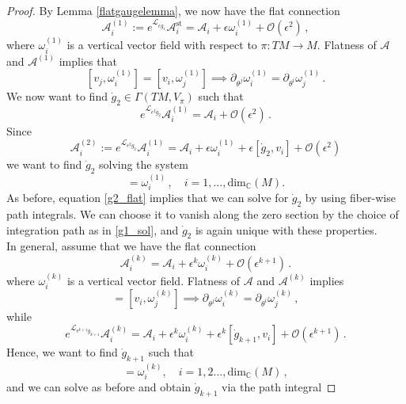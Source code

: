 \documentclass{article}
\theoremstyle{definition}
\numberwithin{equation}{section}
\begin{document}
\begin{proof}
By Lemma \ref{flatgaugelemma}, we now have the flat connection
\begin{equation*}
    \mathcal{A}_i^{(1)}:=e^{\mathcal{L}_{\epsilon\dot{g}_1}}\mathcal{A}^{\text{st}}_i=\mathcal{A}_i+\epsilon\omega_i^{(1)}+\mathcal{O}(\epsilon^2)\,,
\end{equation*}
where $\omega_i^{(1)}$ is a vertical vector field with respect to $\pi:TM \to M$. 
Flatness of $\mathcal{A}$ and $\mathcal{A}^{(1)}$ implies that
\begin{equation}\label{g2_flat}
    [v_j,\omega_i^{(1)}]=[v_i,\omega_j^{(1)}] \implies\partial_{\theta^j}\omega_i^{(1)}=\partial_{\theta^i}\omega_j^{(1)}\,.
\end{equation}
We now want to find $\dot{g}_2\in \Gamma(TM,V_{\pi})$ such that
\begin{equation*}
    e^{\mathcal{L}_{\epsilon^2\dot{g}_2}}\mathcal{A}_i^{(1)}=\mathcal{A}_i+\mathcal{O}(\epsilon^2)\,.
\end{equation*}
Since
\begin{equation*}
    \mathcal{A}_i^{(2)}:=e^{\mathcal{L}_{\epsilon^2\dot{g}_2}}\mathcal{A}_i^{(1)}=\mathcal{A}_i+\epsilon\omega_i^{(1)}+\epsilon[\dot{g}_2,v_i]+\mathcal{O}(\epsilon^2)
\end{equation*}
we want to find $\dot{g}_2$ solving the system 
\begin{equation*}
    [v_i,\dot{g}_2]=\omega_i^{(1)}\,, \quad i=1,...,\text{dim}_{\mathbb{C}}(M). 
\end{equation*}
As before, equation \eqref{g2_flat} implies that we can solve for $\dot{g}_2$ by using fiber-wise path integrals. We can choose it to vanish along the zero section by the choice of integration path as in \eqref{g1_sol}, and $\dot{g}_2$ is again unique with these properties. \\

In general, assume that we have the flat connection 
\begin{equation*}
    \mathcal{A}_i^{(k)}=\mathcal{A}_i+\epsilon^k\omega_i^{(k)}+\mathcal{O}(\epsilon^{k+1})\,.
\end{equation*}
where $\omega_i^{(k)}$ is a vertical vector field. Flatness of $\mathcal{A}$ and $\mathcal{A}^{(k)}$ implies
\begin{equation*}
    [v_j,\omega_i^{(k)}]=[v_i,\omega_j^{(k)}] \implies\partial_{\theta^j}\omega_i^{(k)}=\partial_{\theta^i}\omega_j^{(k)}\,,
\end{equation*}
while
\begin{equation*}
    e^{\mathcal{L}_{\epsilon^{k+1}\dot{g}_{k+1}}}\mathcal{A}_i^{(k)}=\mathcal{A}_i+\epsilon^{k}\omega_i^{(k)}+\epsilon^k[\dot{g}_{k+1},v_i]+\mathcal{O}(\epsilon^{k+1})\,.
\end{equation*}
Hence, we want to find $\dot{g}_{k+1}$  such that
\begin{equation*}
    [v_i,\dot{g}_{k+1}]=\omega_i^{(k)}, \quad i =1,2...,\text{dim}_{\mathbb{C}}(M)\,,
\end{equation*} and we can solve as before and obtain $\dot{g}_{k+1}$ via the path integral


\end{proof}
\end{document}
